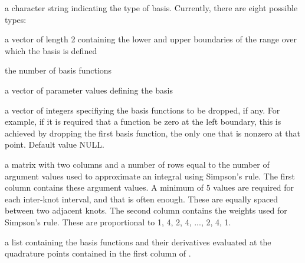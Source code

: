 \documentclass{article}
\begin{document}
\begin{Arguments}
\begin{ldescription}
\item[\code{type}] a character string indicating the type of basis.  Currently,
there are eight possible types:



\item[\code{rangeval}] a vector of length 2 containing the lower and upper boundaries
of the range over which the basis is defined

\item[\code{nbasis}] the number of basis functions

\item[\code{params}] a vector of parameter values defining the basis

\item[\code{dropind}] a vector of integers specifiying the basis functions to
be dropped, if any.  For example, if it is required that
a function be zero at the left boundary, this is achieved
by dropping the first basis function, the only one that
is nonzero at that point. Default value NULL.

\item[\code{quadvals}] a matrix with two columns and a number of rows equal to the number of
argument values used to approximate an integral using Simpson's rule.
The first column contains these argument values.
A minimum of 5 values are required for
each inter-knot interval, and that is often enough. These
are equally spaced between two adjacent knots.
The second column contains the weights used for Simpson's
rule.  These are proportional to 1, 4, 2, 4, ..., 2, 4, 1.

\item[\code{values}] a list containing the basis functions and their derivatives
evaluated at the quadrature points contained in the first
column of .

\end{ldescription}
\end{Arguments}
\end{document}
